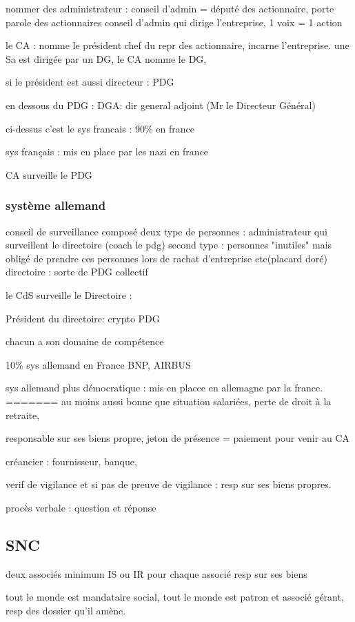 \documentclass[a4paper,12pt]{article}
\begin{document}
nommer des administrateur : conseil d'admin  = député des actionnaire, porte parole des actionnaires
conseil d'admin qui dirige l'entreprise, 1 voix = 1 action

le CA : nomme le président chef du repr des actionnaire, incarne l'entreprise.
une Sa est dirigée par un DG, le CA nomme le DG, 

si le président est aussi directeur : PDG


en dessous du PDG : DGA: dir general adjoint (Mr le Directeur Général)

ci-dessus c'est le sys francais : 90\% en france

sys français : mis en place par les nazi en france

CA surveille le PDG
\subsubsection{système allemand}

conseil de surveillance composé deux type de personnes : administrateur qui surveillent le directoire (coach le pdg)
second type : personnes "inutiles" mais obligé de prendre ces personnes lors de rachat d'entreprise etc(placard doré)
directoire : sorte de PDG collectif

le CdS surveille le Directoire : 

Président du directoire: crypto PDG

chacun a son domaine de compétence

10\% sys allemand en France
BNP, AIRBUS

sys allemand plus démocratique : mis en placce en allemagne par la france.
=======
au moins aussi bonne que situation salariées, perte de droit à la retraite,

responsable sur ses biens propre, jeton de présence = paiement pour venir au CA

créancier : fournisseur,  banque,

verif de vigilance et si pas de preuve de vigilance : resp sur ses biens propres. 

procès verbale : question et réponse     

\subsection{SNC}


deux associés minimum
IS ou IR pour chaque associé
resp sur ses biens 

tout le monde est mandataire social, tout le monde est patron et associé gérant,
resp des dossier qu'il amène.
\end{document}
